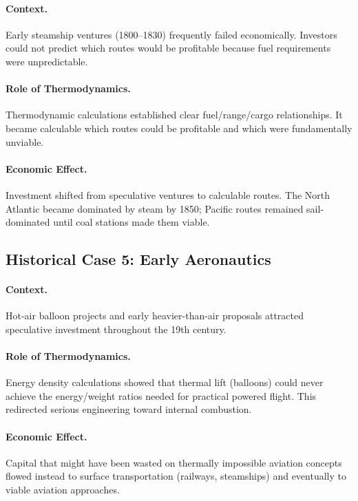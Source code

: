 \paragraph{Context.} Early steamship ventures (1800--1830) frequently failed
economically. Investors could not predict which routes would be profitable
because fuel requirements were unpredictable.

\paragraph{Role of Thermodynamics.} Thermodynamic calculations established
clear fuel/range/cargo relationships. It became calculable which routes
could be profitable and which were fundamentally unviable.

\paragraph{Economic Effect.} Investment shifted from speculative ventures to
calculable routes. The North Atlantic became dominated by steam by 1850;
Pacific routes remained sail-dominated until coal stations made them viable.

\subsection{Historical Case 5: Early Aeronautics}

\paragraph{Context.} Hot-air balloon projects and early heavier-than-air
proposals attracted speculative investment throughout the 19th century.

\paragraph{Role of Thermodynamics.} Energy density calculations showed that
thermal lift (balloons) could never achieve the energy/weight ratios needed
for practical powered flight. This redirected serious engineering toward
internal combustion.

\paragraph{Economic Effect.} Capital that might have been wasted on thermally
impossible aviation concepts flowed instead to surface transportation
(railways, steamships) and eventually to viable aviation approaches.


